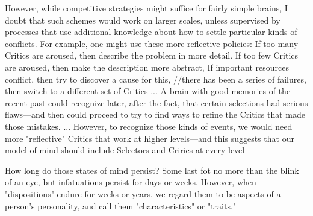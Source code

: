 \documentclass[10pt,a4paper]{article}
\begin{document}
However, while competitive strategies might suffice for fairly simple brains, I doubt that such schemes would work on larger scales, unless supervised by processes that use additional knowledge about how to settle particular kinds of conflicts. For example, one might use these more reflective policies:
If'too many Critics are aroused, then describe the problem in more detail.
If too few Critics are aroused, then make the description more
abstract,
If important resources conflict, then try to discover a cause for this,
//there has been a series of failures, then switch to a different set of Critics
...
A brain with good memories of the recent past could recognize later, after the fact, that certain selections had serious flaws—and then could proceed to try to find ways to refine the Critics that made those mistakes.
...
However, to recognize those kinds of events, we would need more "reflective" Critics that work at higher levels—and this suggests that our model of mind should include Selectors and Crirics at every level\cite[p.~223]{minsky}

How long do those states of mind persist? Some last fot no more than the blink of an eye, but infatuations persist for days or weeks. However, when "dispositions" endure for weeks or years, we regard them to be aspects of a person's personality, and call them "characteristics" or "traits." \cite[p.~224]{minsky}
\end{document}
